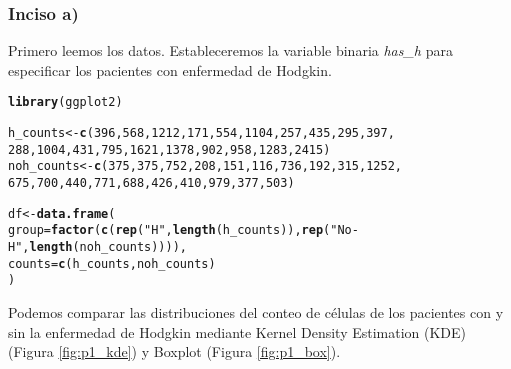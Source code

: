 \documentclass[paper=letter, fontsize=11pt, draft=false]{scrartcl}\usepackage[]{graphicx}\usepackage[]{xcolor}
\makeatletter
\newcommand{\hlnum}[1]{\textcolor[rgb]{0.686,0.059,0.569}{#1}}%
\newcommand{\hlsng}[1]{\textcolor[rgb]{0.192,0.494,0.8}{#1}}%
\newcommand{\hldef}[1]{\textcolor[rgb]{0.345,0.345,0.345}{#1}}%
\newcommand{\hlkwb}[1]{\textcolor[rgb]{0.69,0.353,0.396}{#1}}%
\newcommand{\hlkwc}[1]{\textcolor[rgb]{0.333,0.667,0.333}{#1}}%
\newcommand{\hlkwd}[1]{\textcolor[rgb]{0.737,0.353,0.396}{\textbf{#1}}}%
\newenvironment{kframe}{%
 \def\at@end@of@kframe{}%
 \ifinner\ifhmode%
  \def\at@end@of@kframe{\end{minipage}}%
  \begin{minipage}{\columnwidth}%
 \fi\fi%
 \def\FrameCommand##1{\hskip\@totalleftmargin \hskip-\fboxsep
 \colorbox{shadecolor}{##1}\hskip-\fboxsep
     \hskip-\linewidth \hskip-\@totalleftmargin \hskip\columnwidth}%
 \MakeFramed {\advance\hsize-\width
   \@totalleftmargin\z@ \linewidth\hsize
   \@setminipage}}%
 {\par\unskip\endMakeFramed%
 \at@end@of@kframe}
\newenvironment{knitrout}{}{} %
\numberwithin{equation}{problemcounter} %
\numberwithin{figure}{problemcounter} %
\numberwithin{table}{problemcounter} %
\numberwithin{subsection}{problemcounter}
\makeatother
\begin{document}
\subsubsection*{Inciso a)}

Primero leemos los datos. Estableceremos la variable binaria \textit{has\_h} para especificar los pacientes con enfermedad de Hodgkin.

\begin{knitrout}
\color{fgcolor}\begin{kframe}
\begin{alltt}
\hlkwd{library}\hldef{(ggplot2)}

\hldef{h_counts} \hlkwb{<-} \hlkwd{c}\hldef{(}\hlnum{396}\hldef{,} \hlnum{568}\hldef{,} \hlnum{1212}\hldef{,} \hlnum{171}\hldef{,} \hlnum{554}\hldef{,} \hlnum{1104}\hldef{,} \hlnum{257}\hldef{,} \hlnum{435}\hldef{,} \hlnum{295}\hldef{,} \hlnum{397}\hldef{,}
              \hlnum{288}\hldef{,} \hlnum{1004}\hldef{,} \hlnum{431}\hldef{,} \hlnum{795}\hldef{,} \hlnum{1621}\hldef{,} \hlnum{1378}\hldef{,} \hlnum{902}\hldef{,} \hlnum{958}\hldef{,} \hlnum{1283}\hldef{,} \hlnum{2415}\hldef{)}
\hldef{noh_counts} \hlkwb{<-} \hlkwd{c}\hldef{(}\hlnum{375}\hldef{,} \hlnum{375}\hldef{,} \hlnum{752}\hldef{,} \hlnum{208}\hldef{,} \hlnum{151}\hldef{,} \hlnum{116}\hldef{,} \hlnum{736}\hldef{,} \hlnum{192}\hldef{,} \hlnum{315}\hldef{,} \hlnum{1252}\hldef{,}
                \hlnum{675}\hldef{,} \hlnum{700}\hldef{,} \hlnum{440}\hldef{,} \hlnum{771}\hldef{,} \hlnum{688}\hldef{,} \hlnum{426}\hldef{,} \hlnum{410}\hldef{,} \hlnum{979}\hldef{,} \hlnum{377}\hldef{,} \hlnum{503}\hldef{)}

\hldef{df} \hlkwb{<-} \hlkwd{data.frame}\hldef{(}
\hlkwc{group} \hldef{=} \hlkwd{factor}\hldef{(}\hlkwd{c}\hldef{(}\hlkwd{rep}\hldef{(}\hlsng{"H"}\hldef{,} \hlkwd{length}\hldef{(h_counts)),} \hlkwd{rep}\hldef{(}\hlsng{"No-H"}\hldef{,} \hlkwd{length}\hldef{(noh_counts)))),}
  \hlkwc{counts} \hldef{=} \hlkwd{c}\hldef{(h_counts, noh_counts)}
\hldef{)}
\end{alltt}
\end{kframe}
\end{knitrout}

Podemos comparar las distribuciones del conteo de células de los pacientes con y sin la enfermedad de Hodgkin mediante Kernel Density Estimation (KDE) (Figura \ref{fig:p1_kde}) y Boxplot (Figura \ref{fig:p1_box}).
\end{document}
